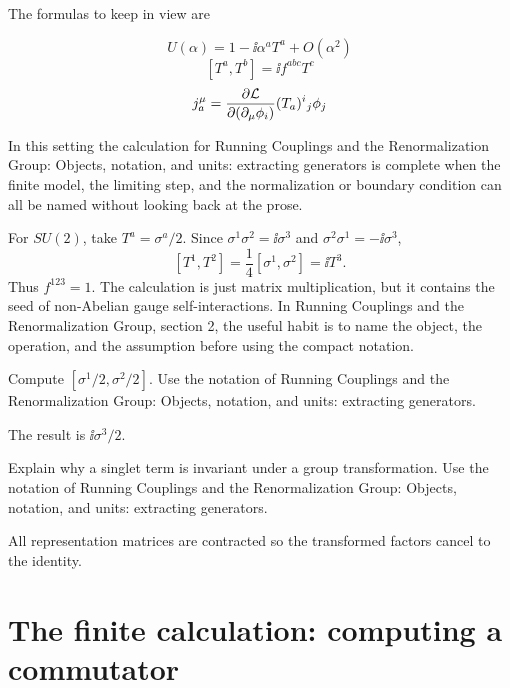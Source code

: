 The formulas to keep in view are

\[
  U(\alpha)=1-\ii\alpha^aT^a+O(\alpha^2)
\]
\[
  [T^a,T^b]=\ii f^{abc}T^c
\]
\[
  j^\mu_a=\frac{\partial\mathcal L}{\partial(\partial_\mu\phi_i)}(T_a)^i{}_j\phi_j
\]

In this setting the calculation for Running Couplings and the Renormalization Group: Objects, notation, and units: extracting generators is complete when the finite model, the limiting step, and the normalization or boundary condition can all be named without looking back at the prose.




\begin{example}
For \(SU(2)\), take \(T^a=\sigma^a/2\).  Since \(\sigma^1\sigma^2=\ii\sigma^3\) and \(\sigma^2\sigma^1=-\ii\sigma^3\),
\[
  [T^1,T^2]=\frac14[\sigma^1,\sigma^2]=\ii T^3.
\]
Thus \(f^{123}=1\).  The calculation is just matrix multiplication, but it contains the seed of non-Abelian gauge self-interactions.  In Running Couplings and the Renormalization Group, section 2, the useful habit is to name the object, the operation, and the assumption before using the compact notation.
\end{example}



\begin{exercise}
Compute \([\sigma^1/2,\sigma^2/2]\).  Use the notation of Running Couplings and the Renormalization Group: Objects, notation, and units: extracting generators.
\begin{answer}
The result is \(\ii\sigma^3/2\).
\end{answer}
\end{exercise}

\begin{exercise}
Explain why a singlet term is invariant under a group transformation.  Use the notation of Running Couplings and the Renormalization Group: Objects, notation, and units: extracting generators.
\begin{answer}
All representation matrices are contracted so the transformed factors cancel to the identity.
\end{answer}
\end{exercise}



\section{The finite calculation: computing a commutator}

